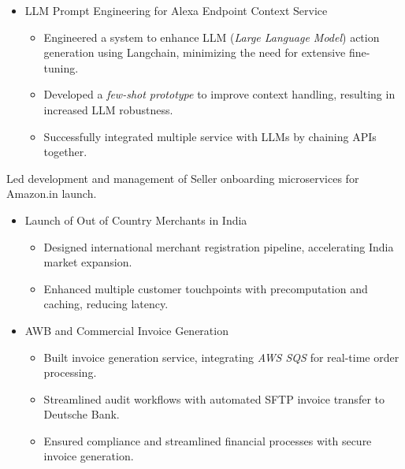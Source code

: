 {\begin{itemize}
\begin{itemize}
            \item Showcased the ability to work \textit{effectively across teams} to deliver a complex product launch.
        \end{itemize}
    \item LLM Prompt Engineering for Alexa Endpoint Context Service
        \begin{itemize}
            \item Engineered a system to enhance LLM (\textit{Large Language Model}) action generation using Langchain, minimizing the need for extensive fine-tuning.
            \item Developed a \textit{few-shot prototype} to improve context handling, resulting in increased LLM robustness.
            \item Successfully integrated multiple service with LLMs by chaining APIs together.
        \end{itemize}
\end{itemize}}

{Led development and management of Seller onboarding microservices for Amazon.in launch.\newline{}
\begin{itemize}
\setlength\itemsep{1em}
    \item Launch of Out of Country Merchants in India 
        \begin{itemize}
            \item Designed international merchant registration pipeline, accelerating India market expansion.
            \item Enhanced multiple customer touchpoints with precomputation and caching, reducing latency.
        \end{itemize}
    \item AWB and Commercial Invoice Generation
        \begin{itemize}
            \item Built invoice generation service, integrating \textit{AWS SQS} for real-time order processing.
            \item Streamlined audit workflows with automated SFTP invoice transfer to Deutsche Bank.
            \item Ensured compliance and streamlined financial processes with secure invoice generation.
        \end{itemize}
\end{itemize}}
